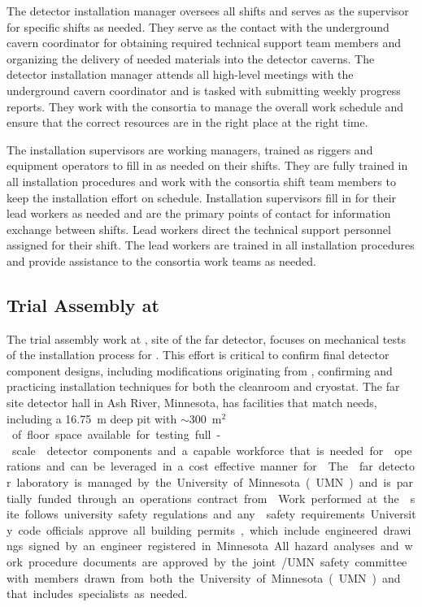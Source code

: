 The detector installation manager oversees all shifts and serves as
the supervisor for specific shifts as needed.  They serve as the
contact with the underground cavern coordinator for obtaining
required technical support team members and organizing the delivery of
needed materials into the detector caverns.  The detector installation
manager attends all high-level meetings with the underground cavern
coordinator and is tasked with submitting weekly progress reports.
They work with the  consortia to manage the overall work
schedule and ensure that the correct resources are in the right place
at the right time.
    
The installation supervisors are working managers, trained as riggers
and equipment operators to fill in as needed on their shifts.  They
are fully trained in all installation procedures and work with the
consortia shift team members to keep the installation effort on
schedule.  Installation supervisors fill in for their lead workers as
needed and are the primary points of contact for information exchange
between shifts.  Lead workers direct the technical support personnel
assigned for their shift.  The lead workers are trained in all
installation procedures and provide assistance to the consortia work
teams as needed.

\subsection{Trial Assembly at }

The trial assembly work at , site of the 
far detector, focuses on mechanical tests of the installation
process for . This effort is critical to confirm final
detector component designs, including modifications originating from
, confirming and practicing installation techniques
for both the cleanroom and cryostat.  The  far site
detector hall in Ash River, Minnesota, has facilities that
match  needs, including a \SI{16.75}{m} deep pit with
$\sim$\SI{300}{m$^2$} of floor space available for testing full-scale
 detector components and a capable workforce that is
needed for  operations and can be leveraged in a cost effective
manner for .  The  far detector laboratory is
managed by the University of Minnesota (UMN) and is partially funded
through an operations contract from .  Work performed at
the  site follows university safety regulations and
any  safety requirements. University code officials approve
all building permits, which include engineered drawings signed by an
engineer registered in Minnesota. All hazard analyses and work
procedure documents are approved by the joint /UMN safety
committee with members drawn from both the University of Minnesota
(UMN) and  that includes specialists as needed.

